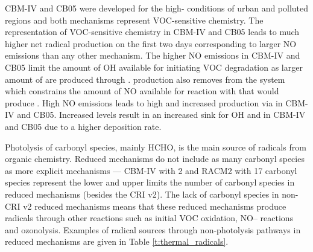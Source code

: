 CBM-IV and CB05 were developed for the high- conditions of urban and polluted regions \citep{Gery:1989, Yarwood:2005} and both mechanisms represent VOC-sensitive chemistry.
The representation of VOC-sensitive chemistry in CBM-IV and CB05 leads to much higher net radical production on the first two days corresponding to larger NO emissions than any other mechanism.
The higher NO emissions in CBM-IV and CB05 limit the amount of OH available for initiating VOC degradation as larger amount of  are produced through .
 production also removes  from the system which constrains the amount of NO available for reaction with  that would produce .
High NO emissions leads to high  and increased  production via  in CBM-IV and CB05.
Increased  levels result in an increased sink for OH and  in CBM-IV and CB05 due to a higher  deposition rate.

Photolysis of carbonyl species, mainly HCHO, is the main source of radicals from organic chemistry.
Reduced mechanisms do not include as many carbonyl species as more explicit mechanisms --- CBM-IV with 2 and RACM2 with 17 carbonyl species represent the lower and upper limits the number of carbonyl species in reduced mechanisms (besides the CRI v2).
The lack of carbonyl species in non-CRI v2 reduced mechanisms means that these reduced mechanisms produce radicals through other reactions such as initial VOC oxidation, NO-- reactions and ozonolysis.
Examples of radical sources through non-photolysis pathways in reduced mechanisms are given in Table \ref{t:thermal_radicals}.

